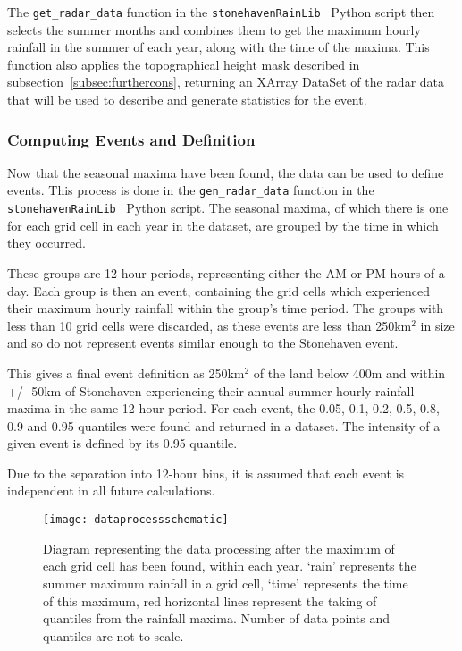 The \texttt{get\_radar\_data} function in the \texttt{stonehavenRainLib}~\cite{Me_Code} Python script then selects the summer months and
    combines them to get the maximum hourly rainfall in the summer of each year,
    along with the time of the maxima.
This function also applies the topographical height mask described in subsection~\ref{subsec:furthercons},
    returning an XArray DataSet of the radar data that will be used to describe and generate statistics for the event.

\subsubsection{Computing Events and Definition}

Now that the seasonal maxima have been found,
    the data can be used to define events.
This process is done in the \texttt{gen\_radar\_data} function in the \texttt{stonehavenRainLib}~\cite{Me_Code} Python script.
The seasonal maxima,
    of which there is one for each grid cell in each year in the dataset,
    are grouped by the time in which they occurred.

These groups are 12-hour periods,
    representing either the AM or PM hours of a day.
Each group is then an event,
    containing the grid cells which experienced their maximum hourly rainfall within the group's time period.
The groups with less than 10 grid cells were discarded,
    as these events are less than 250km$^2$ in size and
    so do not represent events similar enough to the Stonehaven event.

This gives a final event definition as 250km$^2$ of the land below 400m and within +/- 50km of Stonehaven
    experiencing their annual summer hourly rainfall maxima in the same 12-hour period.
For each event, the 0.05, 0.1, 0.2, 0.5, 0.8, 0.9 and 0.95 quantiles were found and returned in a dataset.
The intensity of a given event is defined by its 0.95 quantile.

Due to the separation into 12-hour bins,
    it is assumed that each event is independent in all future calculations.

\begin{figure}[H]
    \centering
    \texttt{[image: dataprocessschematic]}
    \caption[Diagram representing the data processing.]{
        Diagram representing the data processing after the maximum of each grid cell has been found,
    within each year.
    `rain' represents the summer maximum rainfall in a grid cell,
        `time' represents the time of this maximum,
        red horizontal lines represent the taking of quantiles from the rainfall maxima.
    Number of data points and quantiles are not to scale.}
    \label{fig:dataprocessschematic}
\end{figure}

